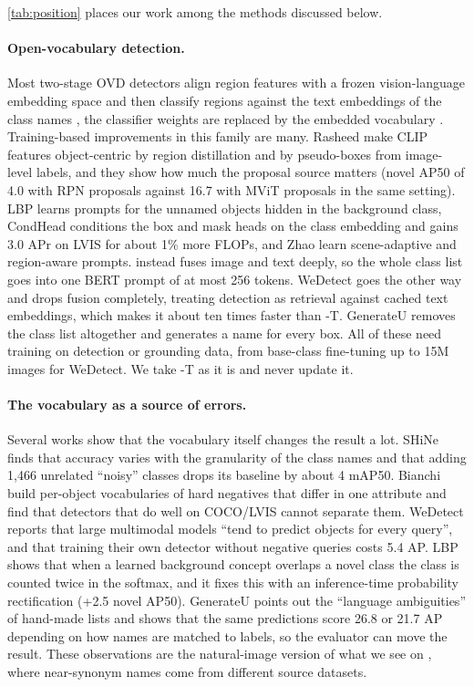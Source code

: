 \cref{tab:position} places our work among the methods discussed below.

\paragraph{Open-vocabulary detection.}
Most two-stage OVD detectors align region features with a frozen vision-language embedding space and then classify regions against the text embeddings of the class names \cite{radford2021clip}, \ie the classifier weights are replaced by the embedded vocabulary \cite{rasheed2022bridging}.
Training-based improvements in this family are many.
Rasheed \etal \cite{rasheed2022bridging} make CLIP features object-centric by region distillation and by pseudo-boxes from image-level labels, and they show how much the proposal source matters (novel AP50 of 4.0 with RPN proposals against 16.7 with MViT proposals in the same setting).
LBP \cite{li2024lbp} learns prompts for the unnamed objects hidden in the background class, CondHead \cite{wang2023condhead} conditions the box and mask heads on the class embedding and gains 3.0 APr on LVIS for about 1\% more FLOPs, and Zhao \etal \cite{zhao2024samp} learn scene-adaptive and region-aware prompts.
\gdino \cite{liu2024grounding} instead fuses image and text deeply, so the whole class list goes into one BERT \cite{devlin2019bert} prompt of at most 256 tokens.
WeDetect \cite{fu2026wedetect} goes the other way and drops fusion completely, treating detection as retrieval against cached text embeddings, which makes it about ten times faster than \gdino-T.
GenerateU \cite{lin2024generateu} removes the class list altogether and generates a name for every box.
All of these need training on detection or grounding data, from base-class fine-tuning up to 15M images for WeDetect.
We take \gdino-T as it is and never update it.

\paragraph{The vocabulary as a source of errors.}
Several works show that the vocabulary itself changes the result a lot.
SHiNe \cite{liu2024shine} finds that accuracy varies with the granularity of the class names and that adding 1,466 unrelated ``noisy'' classes drops its baseline by about 4 mAP50.
Bianchi \etal \cite{bianchi2024devil} build per-object vocabularies of hard negatives that differ in one attribute and find that detectors that do well on COCO/LVIS cannot separate them.
WeDetect \cite{fu2026wedetect} reports that large multimodal models ``tend to predict objects for every query'', and that training their own detector without negative queries costs 5.4 AP.
LBP \cite{li2024lbp} shows that when a learned background concept overlaps a novel class the class is counted twice in the softmax, and it fixes this with an inference-time probability rectification (+2.5 novel AP50).
GenerateU \cite{lin2024generateu} points out the ``language ambiguities'' of hand-made lists and shows that the same predictions score 26.8 or 21.7 AP depending on how names are matched to labels, so the evaluator can move the result.
These observations are the natural-image version of what we see on \lae, where near-synonym names come from different source datasets.

